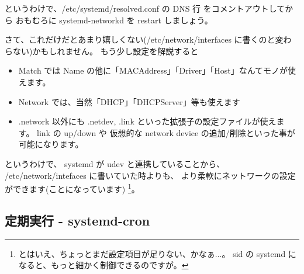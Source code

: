 \documentclass[mingoth,a4paper]{jsarticle}
\begin{document}
というわけで、/etc/systemd/resolved.conf の DNS 行 をコメントアウトしてから
おもむろに systemd-networkd を restart しましょう。

さて、これだけだとあまり嬉しくない(/etc/network/interfaces に書くのと変わらない)かもしれません。
もう少し設定を解説すると
\begin{itemize}
\item %
  Match では Name の他に「MACAddress」「Driver」「Host」なんてモノが使えます。
\item %
  Network では、当然「DHCP」「DHCPServer」等も使えます
\item %
  .network 以外にも .netdev, .link といった拡張子の設定ファイルが使えます。
  link の up/down や 仮想的な network device の追加/削除といった事が可能になります。
\end{itemize}
というわけで、
systemd が udev と連携していることから、
/etc/network/intefaces に書いていた時よりも、
より柔軟にネットワークの設定ができます(ことになっています)%
\footnote{%
  とはいえ、ちょっとまだ設定項目が足りない、かなぁ...。
  sid の systemd になると、もっと細かく制御できるのですが。
}。

\subsection{定期実行  - systemd-cron}
\end{document}
